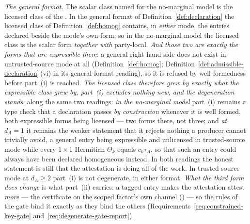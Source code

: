 \begin{remark}
\emph{The general format.} The scalar class named for the no-marginal model
is the licensed class of the . In the general format of
Definition~\ref{def:declaration} the licensed class of
Definition~\ref{def:homog} contains, in \emph{either} mode, the entries
declared  beside the mode's own form; so in the
no-marginal model the licensed class is the scalar form \emph{together with}
party-local. \emph{And those two are exactly the forms that are
expressible there}: a general right-hand side does not exist in
untrusted-source mode at all (Definition~\ref{def:homog};
Definition~\ref{def:admissible-declaration}\,(vi) in its general-format reading), so it is
refused by well-formedness before part~(i) is reached. \emph{The licensed
class therefore grew by exactly what the expressible class grew by, part~(i)
excludes nothing new, and the degeneration stands}, along the same two
readings: \emph{in the no-marginal model} part~(i) remains a type check that
a declaration passes \emph{by construction} whenever it is well formed, both
expressible forms being licensed --- two forms there, not three; and
\emph{at $d_A=1$} it remains the weaker statement that it rejects nothing a
producer cannot trivially avoid, a general entry being expressible and
unlicensed in trusted-source mode while every $1\times1$ Hermitian
$\Theta_k$ equals $c_k\tau_A$, so that such an entry could always have been
declared homogeneous instead. In both readings the honest statement is still
that the attestation is doing all of the work. In trusted-source mode at
$d_A\ge2$ part~(i) is not degenerate, in either format. \emph{What the third
form does change} is what part~(ii) carries: a tagged entry makes the
attestation attest \emph{more} --- the certificate on the scoped factor's
own channel () --- so the
rules of the gate bind it exactly as they bind the others
(Requirements~\ref{req:constrained-key-gate}
and~\ref{req:degenerate-gate-report}).
\end{remark}
